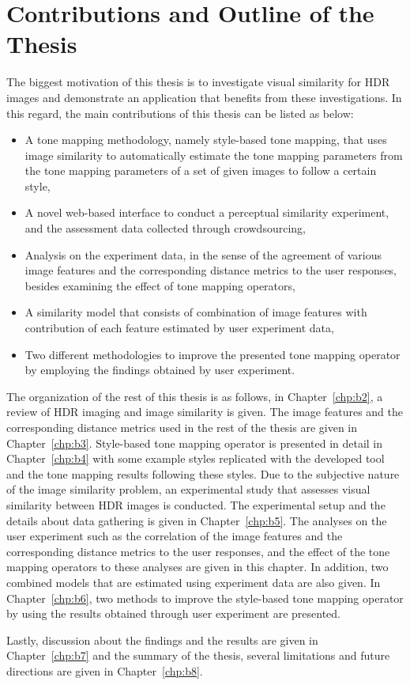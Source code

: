 \section{Contributions and Outline of the Thesis}
The biggest motivation of this thesis is to investigate visual similarity for HDR images and demonstrate an application that benefits from these investigations. In this regard, the main contributions of this thesis can be listed as below: 
\begin{itemize}
    \item A tone mapping methodology, namely style-based tone mapping, that uses image similarity to automatically estimate the tone mapping parameters from the tone mapping parameters of a set of given images to follow a certain style,
    \item A novel web-based interface to conduct a perceptual similarity experiment, and the assessment data collected through crowdsourcing,
    \item Analysis on the experiment data, in the sense of the agreement of various image features and the corresponding distance metrics to the user responses, besides examining the effect of tone mapping operators,
    \item A similarity model that consists of combination of image features with contribution of each feature estimated by user experiment data,
    \item Two different methodologies to improve the presented tone mapping operator by employing the findings obtained by user experiment.
\end{itemize}


The organization of the rest of this thesis is as follows, in Chapter~\ref{chp:b2}, a review of HDR imaging and image similarity is given. The image features and the corresponding distance metrics used in the rest of the thesis are given in Chapter~\ref{chp:b3}. Style-based tone mapping operator is presented in detail in Chapter~\ref{chp:b4} with some example styles replicated with the developed tool and the tone mapping results following these styles. Due to the subjective nature of the image similarity problem, an experimental study that assesses visual similarity between HDR images is conducted. The experimental setup and the details about data gathering is given in Chapter~\ref{chp:b5}. The analyses on the user experiment such as the correlation of the image features and the corresponding distance metrics to the user responses, and the effect of the tone mapping operators to these analyses are given in this chapter. In addition, two combined models that are estimated using experiment data are also given. In Chapter~\ref{chp:b6}, two methods to improve the style-based tone mapping operator by using the results obtained through user experiment are presented. 

Lastly, discussion about the findings and the results are given in Chapter~\ref{chp:b7} and the summary of the thesis, several limitations and future directions are given in Chapter~\ref{chp:b8}.






